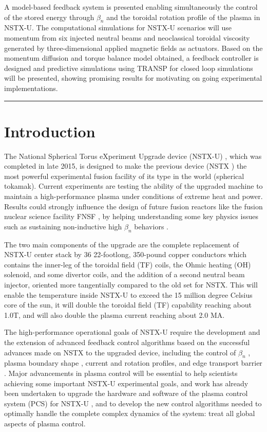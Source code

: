 \documentclass[12pt,lot, lof]{puthesis}
\begin{document}
\noindent
A model-based feedback system is presented enabling simultaneously the control of the stored energy through $\beta_n$  and the toroidal rotation profile of the plasma in NSTX-U. The computational simulations for NSTX-U scenarios will use momentum from six injected neutral beams and neoclassical toroidal viscosity generated by three-dimensional applied magnetic fields as actuators. Based on the momentum diffusion and torque balance model obtained, a feedback controller is designed and predictive simulations using TRANSP for closed loop simulations will be presented, showing promising results for motivating on going experimental implementations. \\

\hrule


\section{Introduction}
%
The National Spherical Torus eXperiment Upgrade device (NSTX-U) \cite{Menard12}, which was completed in late 2015, is designed to make the previous device (NSTX \cite{Ono00}) the most powerful experimental fusion facility of its type in the world (spherical tokamak). Current experiments are testing the ability of the upgraded machine to maintain a high-performance plasma under conditions of extreme heat and power. Results could strongly influence the design of future fusion reactors like the fusion nuclear science facility FNSF \cite{Peng05, Peng11, Peng09}, by helping understanding some key physics issues such as sustaining non-inductive high $\beta_n$ behaviors \cite{Gates07, Menard07, Gates09, Gerhardt11, Buttery04, Chapman11}.

The two main components of the upgrade are the complete replacement of NSTX-U center stack by 36 22-footlong, 350-pound copper conductors which contains the inner-leg of the toroidal field (TF) coils, the Ohmic heating (OH) solenoid, and some divertor coils, and the addition of a second neutral beam injector, oriented more tangentially compared to the old set for NSTX. This will enable the temperature inside NSTX-U to exceed the 15 million degree Celsius core of the sun, it will double the toroidal field (TF) capability reaching about 1.0T, and will also double the plasma current reaching about 2.0 MA. 

The high-performance operational goals of NSTX-U require the development and the extension of advanced feedback control algorithms based on the successful advances made on NSTX to the upgraded device, including the control of $\beta_n$ \cite{Gerhardt12}, plasma boundary shape \cite{Gates06, Kolemen11}, current \cite{Boyer15} and rotation \cite{Goumiri15}  profiles, and edge transport barrier \cite{Kolemen10}. Major advancements in plasma control will be essential to help scientists achieving some important NSTX-U experimental goals, and work has already been undertaken to upgrade the hardware and software of the plasma control system (PCS) for NSTX-U \cite{Erickson14}, and to develop the new control algorithms needed to optimally handle the complete complex dynamics of the system: treat all global aspects of plasma control.
\end{document}
